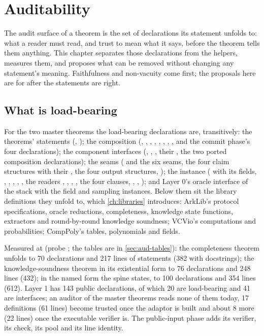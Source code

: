 \chapter{Auditability}\label{ch:auditability}

The audit surface of a theorem is the set of declarations its statement unfolds to: what a
reader must read, and trust to mean what it says, before the theorem tells them anything. This
chapter separates those declarations from the helpers, measures them, and proposes what can be
removed without changing any statement's meaning. Faithfulness and non-vacuity come first; the
proposals here are for after the statements are right.

\section{What is load-bearing}\label{sec:aud-loadbearing}

For the two master theorems the load-bearing declarations are, transitively: the theorems'
statements (, ); the
composition (, , , ,
, , , , and the
commit phase's four declarations); the component interfaces (,
, , their , the two ported composition
declarations); the seams ( and the six seams, the four claim structures with
their , the four output structures, ); the instance
( with its fields, , , ,
, , the readers , ,
, , the four clauses, , ,
); and Layer 0's oracle interface of the stack with the field and sampling
instances. Below them sit the library definitions they unfold to, which \cref{ch:libraries}
introduces: ArkLib's protocol specifications, oracle reductions, completeness, knowledge state
functions, extractors and round-by-round knowledge soundness; VCVio's computations and
probabilities; CompPoly's tables, polynomials and fields.

Measured at  (probe ; the tables are in \cref{sec:aud-tables}):
the completeness theorem unfolds to 70 declarations and 217 lines of statements (382 with
docstrings); the knowledge-soundness theorem in its existential form to 76 declarations and
248 lines (432); in the named form the spine states, to 100 declarations and 354 lines (612).
Layer 1 has 143 public declarations, of which 20 are load-bearing and 41 are interfaces; an
auditor of the master theorems reads none of them today, 17 definitions (61 lines) become
trusted once the adaptor is built and about 8 more (22 lines) once the executable verifier is.
The public-input phase adds its verifier, its check, its pool and its line identity.

